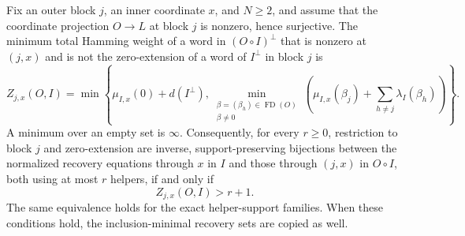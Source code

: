 \begin{theorem}
\label{thm:weighted-pointed-confinement}
%
Fix an outer block $j$, an inner coordinate $x$, and $N\geq2$, and assume
that the coordinate projection $O\to L$ at block $j$ is nonzero, hence
surjective.  The minimum total Hamming weight of a word in $(O\circ I)^\perp$
that is nonzero at $(j,x)$ and is not the zero-extension of a word of
$I^\perp$ in block $j$ is
\begin{equation}
 Z_{j,x}(O,I)=
 \min\left\{
  \mu_{I,x}(0)+d(I^\perp),
  \min_{\substack{\beta=(\beta_h)\in\operatorname{FD}(O)\\\beta\neq0}}
  \left(\mu_{I,x}(\beta_j)+
        \sum_{h\neq j}\lambda_I(\beta_h)\right)
 \right\}.
 \label{eq:weighted-pointed-cost}
\end{equation}
A minimum over an empty set is $\infty$.  Consequently, for every $r\geq0$,
restriction to block $j$ and zero-extension are inverse, support-preserving
bijections between the normalized recovery equations through $x$ in $I$ and
those through $(j,x)$ in $O\circ I$, both using at most $r$ helpers, if and
only if
\begin{equation}
 Z_{j,x}(O,I)>r+1.
 \label{eq:weighted-pointed-gate}
\end{equation}
The same equivalence holds for the exact helper-support families.  When these
conditions hold, the inclusion-minimal recovery sets are copied as well.
\end{theorem}


